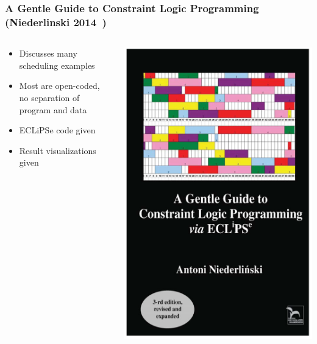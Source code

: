 \documentclass[dvipsnames,aspectratio=169]{beamer}
\begin{document}
\begin{frame}
\frametitle{A Gentle Guide to Constraint Logic Programming (Niederlinski 2014~\cite{Niederlinski2014})}
\begin{columns}
\begin{column}{0.5\textwidth}
\begin{itemize}
\item Discusses many scheduling examples
\item Most are open-coded, no separation of program and data
\item ECLiPSe code given
\item Result visualizations given
\end{itemize}
\end{column}
\begin{column}{0.5\textwidth}
\includegraphics[width=.6\textwidth]{images/Niederlinski14titlepage}
\end{column}
\end{columns}
\end{frame}
\end{document}
